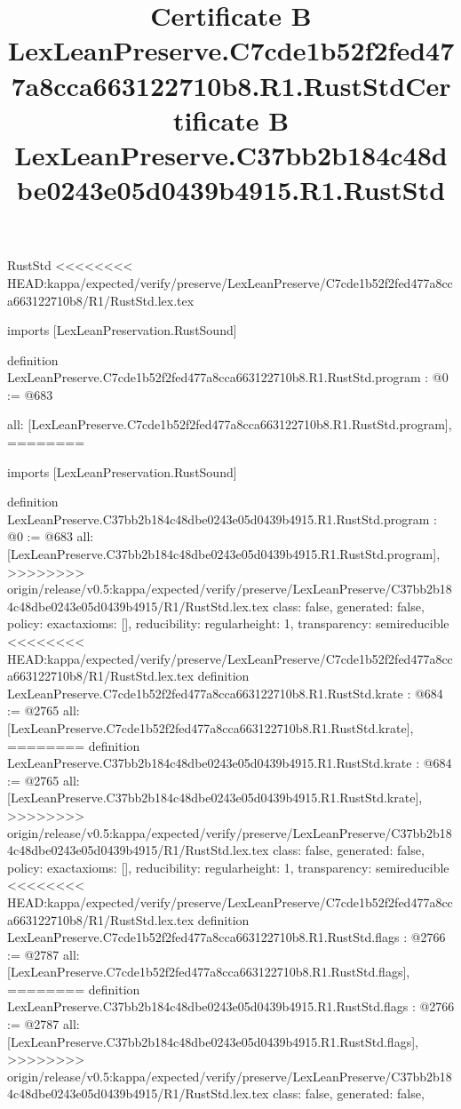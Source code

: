 \begin{lexlean}{RustStd}
<<<<<<<< HEAD:kappa/expected/verify/preserve/LexLeanPreserve/C7cde1b52f2fed477a8cca663122710b8/R1/RustStd.lex.tex
\title{Certificate B LexLeanPreserve.C7cde1b52f2fed477a8cca663122710b8.R1.RustStd}
\begin{coremodule}
imports [LexLeanPreservation.RustSound]

definition LexLeanPreserve.C7cde1b52f2fed477a8cca663122710b8.R1.RustStd.program : @0 := @683 {
  all: [LexLeanPreserve.C7cde1b52f2fed477a8cca663122710b8.R1.RustStd.program],
========
\title{Certificate B LexLeanPreserve.C37bb2b184c48dbe0243e05d0439b4915.R1.RustStd}
\begin{coremodule}
imports [LexLeanPreservation.RustSound]

definition LexLeanPreserve.C37bb2b184c48dbe0243e05d0439b4915.R1.RustStd.program : @0 := @683 {
  all: [LexLeanPreserve.C37bb2b184c48dbe0243e05d0439b4915.R1.RustStd.program],
>>>>>>>> origin/release/v0.5:kappa/expected/verify/preserve/LexLeanPreserve/C37bb2b184c48dbe0243e05d0439b4915/R1/RustStd.lex.tex
  class: false,
  generated: false,
  policy: exact{axioms: []},
  reducibility: regular{height: 1},
  transparency: semireducible
}
<<<<<<<< HEAD:kappa/expected/verify/preserve/LexLeanPreserve/C7cde1b52f2fed477a8cca663122710b8/R1/RustStd.lex.tex
definition LexLeanPreserve.C7cde1b52f2fed477a8cca663122710b8.R1.RustStd.krate : @684 := @2765 {
  all: [LexLeanPreserve.C7cde1b52f2fed477a8cca663122710b8.R1.RustStd.krate],
========
definition LexLeanPreserve.C37bb2b184c48dbe0243e05d0439b4915.R1.RustStd.krate : @684 := @2765 {
  all: [LexLeanPreserve.C37bb2b184c48dbe0243e05d0439b4915.R1.RustStd.krate],
>>>>>>>> origin/release/v0.5:kappa/expected/verify/preserve/LexLeanPreserve/C37bb2b184c48dbe0243e05d0439b4915/R1/RustStd.lex.tex
  class: false,
  generated: false,
  policy: exact{axioms: []},
  reducibility: regular{height: 1},
  transparency: semireducible
}
<<<<<<<< HEAD:kappa/expected/verify/preserve/LexLeanPreserve/C7cde1b52f2fed477a8cca663122710b8/R1/RustStd.lex.tex
definition LexLeanPreserve.C7cde1b52f2fed477a8cca663122710b8.R1.RustStd.flags : @2766 := @2787 {
  all: [LexLeanPreserve.C7cde1b52f2fed477a8cca663122710b8.R1.RustStd.flags],
========
definition LexLeanPreserve.C37bb2b184c48dbe0243e05d0439b4915.R1.RustStd.flags : @2766 := @2787 {
  all: [LexLeanPreserve.C37bb2b184c48dbe0243e05d0439b4915.R1.RustStd.flags],
>>>>>>>> origin/release/v0.5:kappa/expected/verify/preserve/LexLeanPreserve/C37bb2b184c48dbe0243e05d0439b4915/R1/RustStd.lex.tex
  class: false,
  generated: false,
}}}
\end{coremodule}}
\end{coremodule}
\end{lexlean}
